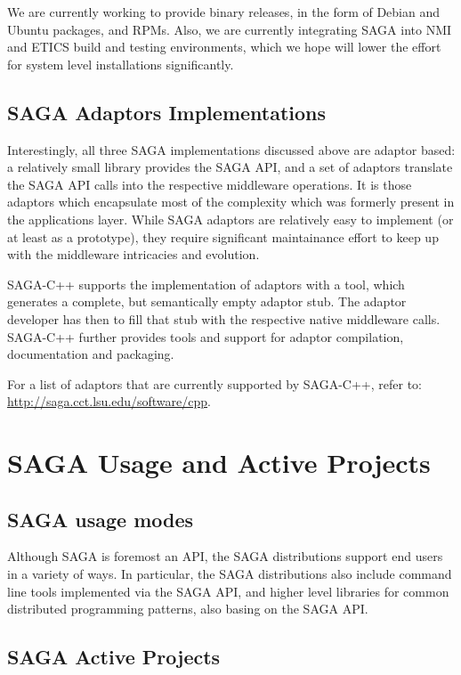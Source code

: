 \documentclass[12pt]{article}
\begin{document}
   We are currently working to provide binary releases, in the form of
   Debian and Ubuntu packages, and RPMs.  Also, we are currently
   integrating SAGA into NMI and ETICS build and testing environments,
   which we hope will lower the effort for system level installations
   significantly.


 \subsection{SAGA Adaptors Implementations}
 \label{ssec:adaptors}

  Interestingly, all three SAGA implementations discussed above are
  adaptor based: a relatively small library provides the SAGA API, and
  a set of adaptors translate the SAGA API calls into the respective
  middleware operations.  It is those adaptors which encapsulate most
  of the complexity which was formerly present in the applications
  layer.  While SAGA adaptors are relatively easy to implement (or at
  least as a prototype), they require significant maintainance effort
  to keep up with the middleware intricacies and evolution.

  SAGA-C++ supports the implementation of adaptors with a tool, which
  generates a complete, but semantically empty adaptor stub.  The
  adaptor developer has then to fill that stub with the respective
  native middleware calls.  SAGA-C++ further provides tools and
  support for adaptor compilation, documentation and packaging.

  For a list of adaptors that are currently supported by SAGA-C++,
  refer to: \url{http://saga.cct.lsu.edu/software/cpp}.



\section{SAGA Usage and Active Projects}

 \subsection{SAGA usage modes}

  Although SAGA is foremost an API, the SAGA distributions support end
  users in a variety of ways.  In particular, the SAGA distributions
  also include command line tools implemented via the SAGA API, and
  higher level libraries for common distributed programming patterns,
  also basing on the SAGA API.

\subsection{SAGA Active Projects}
\end{document}

